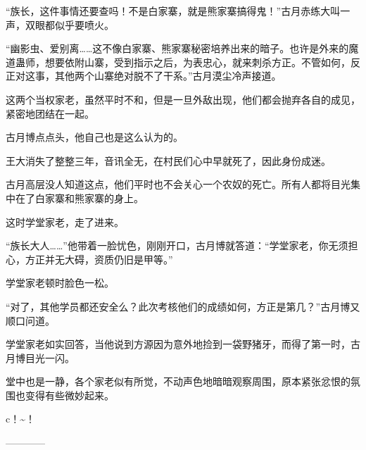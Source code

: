 \begin{this_body}
“族长，这件事情还要查吗！不是白家寨，就是熊家寨搞得鬼！”古月赤练大叫一声，双眼都似乎要喷火。

“幽影虫、爱别离……这不像白家寨、熊家寨秘密培养出来的暗子。也许是外来的魔道蛊师，想要依附山寨，受到指示之后，为表忠心，就来刺杀方正。不管如何，反正对这事，其他两个山寨绝对脱不了干系。”古月漠尘冷声接道。

这两个当权家老，虽然平时不和，但是一旦外敌出现，他们都会抛弃各自的成见，紧密地团结在一起。

古月博点点头，他自己也是这么认为的。

王大消失了整整三年，音讯全无，在村民们心中早就死了，因此身份成迷。

古月高层没人知道这点，他们平时也不会关心一个农奴的死亡。所有人都将目光集中在了白家寨和熊家寨的身上。

这时学堂家老，走了进来。

“族长大人……”他带着一脸忧色，刚刚开口，古月博就答道：“学堂家老，你无须担心，方正并无大碍，资质仍旧是甲等。”

学堂家老顿时脸色一松。

“对了，其他学员都还安全么？此次考核他们的成绩如何，方正是第几？”古月博又顺口问道。

学堂家老如实回答，当他说到方源因为意外地捡到一袋野猪牙，而得了第一时，古月博目光一闪。

堂中也是一静，各个家老似有所觉，不动声色地暗暗观察周围，原本紧张忿恨的氛围也变得有些微妙起来。

c！\~{}！

------------

\end{this_body}

